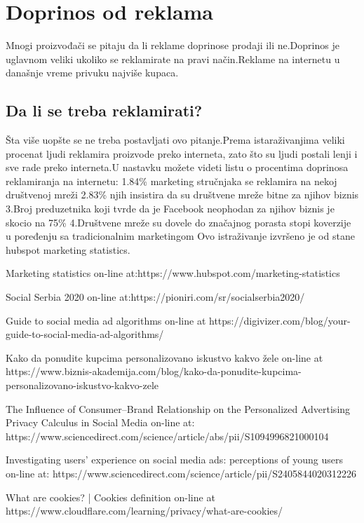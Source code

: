\documentclass[a4paper]{article}
\begin{document}
	\section{Doprinos od reklama}
	\label{sec:doprinos}
	Mnogi proizvođači se pitaju da li reklame doprinose prodaji ili ne.Doprinos je uglavnom veliki ukoliko se reklamirate na pravi način.Reklame na internetu u današnje vreme privuku najviše kupaca.
	\subsection{Da li se treba reklamirati?}
	\label{subsec:potrebna_reklama}
	Šta više uopšte se ne treba postavljati ovo pitanje.Prema istaraživanjima veliki procenat ljudi reklamira proizvode preko interneta, zato što su ljudi postali lenji i sve rade preko interneta.U nastavku možete videti listu o procentima doprinosa reklamiranja na internetu:
	1.84\% marketing stručnjaka se reklamira na nekoj društvenoj mreži
	2.83\% njih insistira da su društvene mreže bitne za njihov biznis
	3.Broj preduzetnika koji tvrde da je Facebook neophodan za njihov biznis je skocio na 75\%
	4.Društvene mreže su dovele do značajnog porasta stopi koverzije u poređenju sa tradicionalnim marketingom 
	Ovo istraživanje izvršeno je od stane hubspot marketing statistics.
	
	\renewcommand{\refname}{Literatura}

	\newpage
	\appendix
	

	
	\begin{thebibliography}{9}
		
		 Marketing statistics on-line at:https://www.hubspot.com/marketing-statistics
		
		 Social Serbia 2020 on-line at:https://pioniri.com/sr/socialserbia2020/
		
			Guide to social media ad algorithms on-line at https://digivizer.com/blog/your-guide-to-social-media-ad-algorithms/ 
		
		 Kako da ponudite kupcima personalizovano iskustvo kakvo žele on-line at https://www.biznis-akademija.com/blog/kako-da-ponudite-kupcima-personalizovano-iskustvo-kakvo-zele
		
		 The Influence of Consumer–Brand Relationship on the Personalized Advertising Privacy Calculus in Social Media on-line at: https://www.sciencedirect.com/science/article/abs/pii/S1094996821000104        
		
		 Investigating users’ experience on social media ads: perceptions of young users on-line at: https://www.sciencedirect.com/science/article/pii/S2405844020312226
		
		 What are cookies? | Cookies definition on-line at https://www.cloudflare.com/learning/privacy/what-are-cookies/
		
		
	\end{thebibliography}
	
	\appendix
\end{document}
